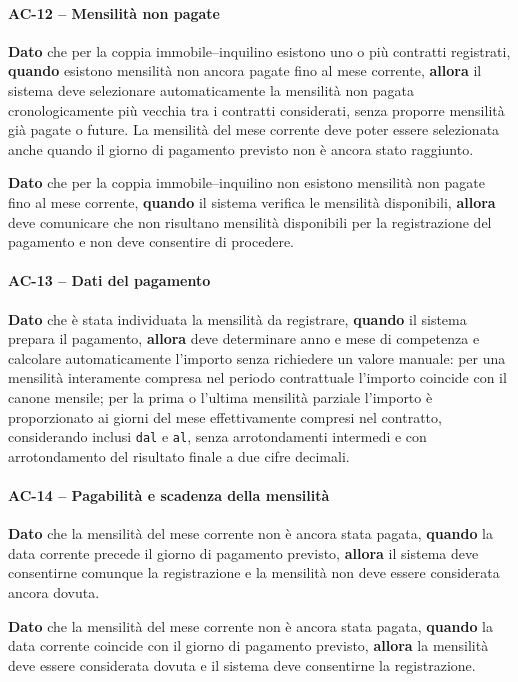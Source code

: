 \documentclass[12pt,a4paper]{article}
\begin{document}
\paragraph{AC-12 -- Mensilità non pagate}
\textbf{Dato} che per la coppia immobile--inquilino esistono uno o più contratti registrati,
\textbf{quando} esistono mensilità non ancora pagate fino al mese corrente,
\textbf{allora} il sistema deve selezionare automaticamente la mensilità non
pagata cronologicamente più vecchia tra i contratti considerati, senza proporre
mensilità già pagate o future. La mensilità del mese corrente deve poter essere
selezionata anche quando il giorno di pagamento previsto non è ancora stato
raggiunto.

\textbf{Dato} che per la coppia immobile--inquilino non esistono mensilità
non pagate fino al mese corrente,
\textbf{quando} il sistema verifica le mensilità disponibili,
\textbf{allora} deve comunicare che non risultano mensilità disponibili per
la registrazione del pagamento e non deve consentire di procedere.

\paragraph{AC-13 -- Dati del pagamento}
\textbf{Dato} che è stata individuata la mensilità da registrare,
\textbf{quando} il sistema prepara il pagamento,
\textbf{allora} deve determinare anno e mese di competenza e calcolare automaticamente
l'importo senza richiedere un valore manuale: per una mensilità interamente compresa nel periodo
contrattuale l'importo coincide con il canone mensile; per la prima o l'ultima mensilità parziale
l'importo è proporzionato ai giorni del mese effettivamente compresi nel contratto, considerando
inclusi \texttt{dal} e \texttt{al}, senza arrotondamenti intermedi e con arrotondamento del
risultato finale a due cifre decimali.

\paragraph{AC-14 -- Pagabilità e scadenza della mensilità}
\textbf{Dato} che la mensilità del mese corrente non è ancora stata pagata,
\textbf{quando} la data corrente precede il giorno di pagamento previsto,
\textbf{allora} il sistema deve consentirne comunque la registrazione e la
mensilità non deve essere considerata ancora dovuta.

\textbf{Dato} che la mensilità del mese corrente non è ancora stata pagata,
\textbf{quando} la data corrente coincide con il giorno di pagamento previsto,
\textbf{allora} la mensilità deve essere considerata dovuta e il sistema deve
consentirne la registrazione.
\end{document}
